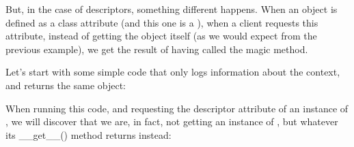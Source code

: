 \documentclass[a4paper,10pt,english]{sphinxmanual}
\begin{document}
But, in the case of descriptors, something different happens. When an object is defined as a
class attribute (and this one is a ), when a client requests this attribute,
instead of getting the object itself (as we would expect from the previous example), we get
the result of having called the  magic method.

Let’s start with some simple code that only logs information about the context, and returns
the same  object:

\begin{sphinxVerbatim}[commandchars=\\\{\}]
 

       
           
             

         
         

 
      
\end{sphinxVerbatim}

When running this code, and requesting the descriptor attribute of an instance of
, we will discover that we are, in fact, not getting an instance of
, but whatever its \_\_get\_\_() method returns instead:

\begin{sphinxVerbatim}[commandchars=\\\{\}]
  
  
\end{sphinxVerbatim}
\end{document}
